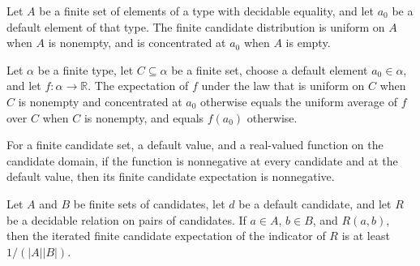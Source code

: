 \begin{definition}
\label{FABL.RegularUniqueGame.finiteCandidatePMF}
\leanok
Let $A$ be a finite set of elements of a type with decidable equality, and let $a_0$ be
a default element of that type. The finite candidate distribution is uniform on $A$ when
$A$ is nonempty, and is concentrated at $a_0$ when $A$ is empty.
\end{definition}

\begin{theorem}
\label{FABL.RegularUniqueGame.pmfExpectation_finiteCandidatePMF}
\leanok
{}
Let $\alpha$ be a finite type, let $C\subseteq\alpha$ be a finite set, choose a default
element $a_0\in\alpha$, and let $f:\alpha\to\mathbb{R}$. The expectation of $f$ under
the law that is uniform on $C$ when $C$ is nonempty and concentrated at $a_0$ otherwise
equals the uniform average of $f$ over $C$ when $C$ is nonempty, and equals $f(a_0)$
otherwise.
\end{theorem}

\begin{theorem}
\label{FABL.RegularUniqueGame.finiteCandidateExpectation_nonneg}
\leanok
{}
For a finite candidate set, a default value, and a real-valued function on the candidate
domain, if the function is nonnegative at every candidate and at the default value, then
its finite candidate expectation is nonnegative.
\end{theorem}

\begin{theorem}
\label{FABL.RegularUniqueGame.finiteCandidatePairExpectation_ge}
\leanok
{}
Let $A$ and $B$ be finite sets of candidates, let $d$ be a default candidate, and let
$R$ be a decidable relation on pairs of candidates. If $a\in A$, $b\in B$, and $R(a,b)$,
then the iterated finite candidate expectation of the indicator of $R$ is at least
$1/(|A||B|)$.
\end{theorem}

